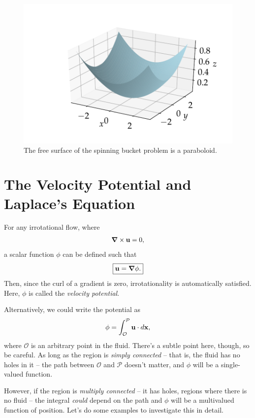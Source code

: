 \begin{figure}
\centering\includegraphics[width=0.8\linewidth]{Figures/Chapter3/fig_paraboloid}
\caption{The free surface of the spinning bucket problem is a paraboloid.}
\label{fig_bucket_para}
\end{figure}





\section{The Velocity Potential and Laplace's Equation}

For any irrotational flow, where
\[
\boldsymbol{\nabla} \times \mathbf{u} = 0,
\]
a scalar function $\phi$ can be defined such that
\begin{equation}
\label{eq_vel_pot}
\boxed{
\mathbf{u} = \boldsymbol{\nabla} \phi.
}
\end{equation}
Then, since the curl of a gradient is zero, irrotationality is automatically satisfied.  Here, $\phi$ is called the \emph{velocity potential}.

Alternatively, we could write the potential as
\begin{equation}
\label{eq_vel_pot2}
\phi = \int_\mathcal{O}^\mathcal{P} \mathbf{u} \cdot d\mathbf{x},
\end{equation}
where $\mathcal{O}$ is an arbitrary point in the fluid.  There's a subtle point here, though, so be careful.  As long as the region is \emph{simply connected} -- that is, the fluid has no holes in it -- the path between $\mathcal{O}$ and $\mathcal{P}$ doesn't matter, and $\phi$ will be a single-valued function.

However, if the region is \emph{multiply connected} -- it has holes, regions where there is no fluid -- the integral \emph{could} depend on the path and $\phi$ will be a multivalued function of position.  Let's do some examples to investigate this in detail.

